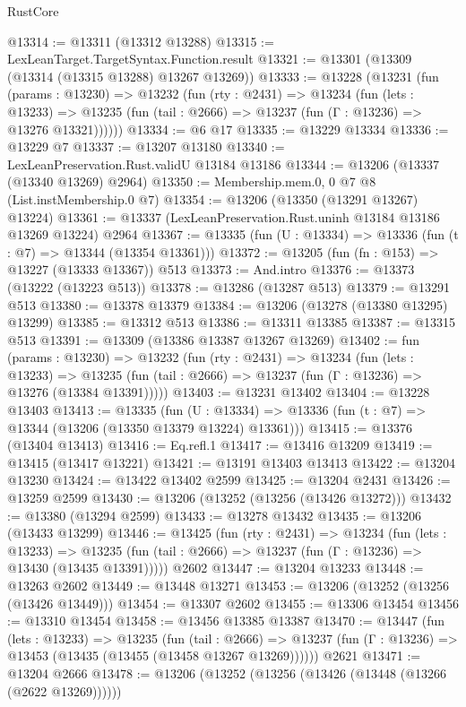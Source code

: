 \begin{lexlean}{RustCore}
\begin{coremodule}
@13314 := @13311 (@13312 @13288)
@13315 := LexLeanTarget.TargetSyntax.Function.result
@13321 := @13301 (@13309 (@13314 (@13315 @13288) @13267 @13269))
@13333 := @13228
    (@13231
      (fun (params : @13230) =>
      @13232
        (fun (rty : @2431) =>
        @13234
          (fun (lets : @13233) =>
          @13235 (fun (tail : @2666) => @13237 (fun (Γ : @13236) => @13276 @13321))))))
@13334 := @6 @17
@13335 := @13229 @13334
@13336 := @13229 @7
@13337 := @13207 @13180
@13340 := LexLeanPreservation.Rust.validU @13184 @13186
@13344 := @13206 (@13337 (@13340 @13269) @2964)
@13350 := Membership.mem.{0, 0} @7 @8 (List.instMembership.{0} @7)
@13354 := @13206 (@13350 (@13291 @13267) @13224)
@13361 := @13337 (LexLeanPreservation.Rust.uninh @13184 @13186 @13269 @13224) @2964
@13367 := @13335 (fun (U : @13334) => @13336 (fun (t : @7) => @13344 (@13354 @13361)))
@13372 := @13205 (fun (fn : @153) => @13227 (@13333 @13367)) @513
@13373 := And.intro
@13376 := @13373 (@13222 (@13223 @513))
@13378 := @13286 (@13287 @513)
@13379 := @13291 @513
@13380 := @13378 @13379
@13384 := @13206 (@13278 (@13380 @13295) @13299)
@13385 := @13312 @513
@13386 := @13311 @13385
@13387 := @13315 @513
@13391 := @13309 (@13386 @13387 @13267 @13269)
@13402 := fun (params : @13230) =>
  @13232
    (fun (rty : @2431) =>
    @13234
      (fun (lets : @13233) =>
      @13235 (fun (tail : @2666) => @13237 (fun (Γ : @13236) => @13276 (@13384 @13391)))))
@13403 := @13231 @13402
@13404 := @13228 @13403
@13413 := @13335
    (fun (U : @13334) => @13336 (fun (t : @7) => @13344 (@13206 (@13350 @13379 @13224) @13361)))
@13415 := @13376 (@13404 @13413)
@13416 := Eq.refl.{1}
@13417 := @13416 @13209
@13419 := @13415 (@13417 @13221)
@13421 := @13191 @13403 @13413
@13422 := @13204 @13230
@13424 := @13422 @13402 @2599
@13425 := @13204 @2431
@13426 := @13259 @2599
@13430 := @13206 (@13252 (@13256 (@13426 @13272)))
@13432 := @13380 (@13294 @2599)
@13433 := @13278 @13432
@13435 := @13206 (@13433 @13299)
@13446 := @13425
    (fun (rty : @2431) =>
    @13234
      (fun (lets : @13233) =>
      @13235 (fun (tail : @2666) => @13237 (fun (Γ : @13236) => @13430 (@13435 @13391)))))
    @2602
@13447 := @13204 @13233
@13448 := @13263 @2602
@13449 := @13448 @13271
@13453 := @13206 (@13252 (@13256 (@13426 @13449)))
@13454 := @13307 @2602
@13455 := @13306 @13454
@13456 := @13310 @13454
@13458 := @13456 @13385 @13387
@13470 := @13447
    (fun (lets : @13233) =>
    @13235
      (fun (tail : @2666) =>
      @13237 (fun (Γ : @13236) => @13453 (@13435 (@13455 (@13458 @13267 @13269))))))
    @2621
@13471 := @13204 @2666
@13478 := @13206 (@13252 (@13256 (@13426 (@13448 (@13266 (@2622 @13269))))))

\end{coremodule}
\end{lexlean}
